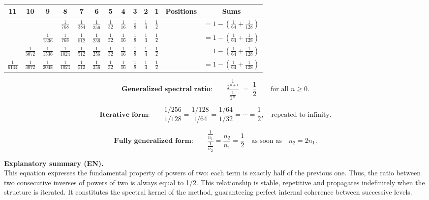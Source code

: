 \documentclass[a4paper,11pt]{article}
\begin{document}
\begin{center}
\scriptsize
\begin{tabular}{|c|c|c|c|c|c|c|c|c|c|c|c|c|}
\hline
11 & 10 & 9 & 8 & 7 & 6 & 5 & 4 & 3 & 2 & 1 & \textbf{Positions} & \textbf{Sums} \\
\hline
 &  &  & $\frac{1}{768}$ & $\frac{1}{384}$ & $\frac{1}{256}$ & $\frac{1}{32}$ & $\frac{1}{16}$ & $\frac{1}{8}$ & $\frac{1}{4}$ & $\frac{1}{2}$ &  & $= 1 - \left(\frac{1}{64} + \frac{1}{128}\right)$ \\
\hline
 &  & $\frac{1}{1536}$ & $\frac{1}{768}$ & $\frac{1}{512}$ & $\frac{1}{256}$ & $\frac{1}{32}$ & $\frac{1}{16}$ & $\frac{1}{8}$ & $\frac{1}{4}$ & $\frac{1}{2}$ &  & $= 1 - \left(\frac{1}{64} + \frac{1}{128}\right)$ \\
\hline
 & $\frac{1}{3072}$ & $\frac{1}{1536}$ & $\frac{1}{1024}$ & $\frac{1}{512}$ & $\frac{1}{256}$ & $\frac{1}{32}$ & $\frac{1}{16}$ & $\frac{1}{8}$ & $\frac{1}{4}$ & $\frac{1}{2}$ &  & $= 1 - \left(\frac{1}{64} + \frac{1}{128}\right)$ \\
\hline
$\frac{1}{6144}$ & $\frac{1}{3072}$ & $\frac{1}{2048}$ & $\frac{1}{1024}$ & $\frac{1}{512}$ & $\frac{1}{256}$ & $\frac{1}{32}$ & $\frac{1}{16}$ & $\frac{1}{8}$ & $\frac{1}{4}$ & $\frac{1}{2}$ &  & $= 1 - \left(\frac{1}{64} + \frac{1}{128}\right)$ \\
\hline
\end{tabular}
\end{center}


\[
\textbf{Generalized spectral ratio:}\qquad
\frac{\displaystyle \frac{1}{2^{\,n+1}}}{\displaystyle \frac{1}{2^{\,n}}}
\;=\;
\frac{1}{2}
\qquad\text{for all } n \ge 0.
\]

\[
\textbf{Iterative form:}\qquad
\frac{1/256}{1/128}
=
\frac{1/128}{1/64}
=
\frac{1/64}{1/32}
=
\cdots
=
\frac{1}{2},
\quad
\text{repeated to infinity.}
\]

\[
\textbf{Fully generalized form:}\qquad
\frac{\displaystyle \frac{1}{n_1}}{\displaystyle \frac{1}{n_2}}
=
\frac{n_2}{n_1}
=
\frac{1}{2}
\quad\text{as soon as}\quad
n_2 = 2n_1.
\]

\textbf{Explanatory summary (EN).} \\
This equation expresses the fundamental property of powers of two: each term
is exactly half of the previous one. Thus, the ratio between two consecutive inverses
of powers of two is always equal to 1/2. This relationship is stable, repetitive
and propagates indefinitely when the structure is iterated. It constitutes the spectral
kernel of the method, guaranteeing perfect internal coherence between successive
levels.
\end{document}
